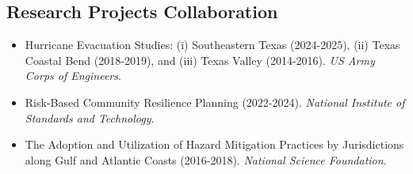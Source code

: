 \documentclass[11pt]{article}
\begin{document}
\subsection*{Research Projects Collaboration}
\begin{itemize}[leftmargin=20pt]
\item Hurricane Evacuation Studies: (i) Southeastern Texas (2024-2025), (ii) Texas Coastal Bend (2018-2019), and (iii) Texas Valley (2014-2016). \emph{US Army Corps of Engineers}.
\item Risk-Based Community Resilience Planning (2022-2024). \emph{National Institute of Standards and Technology}.
\item The Adoption and Utilization of Hazard Mitigation Practices by Jurisdictions along Gulf and Atlantic Coasts (2016-2018). \emph{National Science Foundation}.
\end{itemize}
\end{document}
